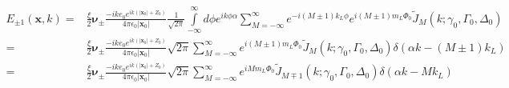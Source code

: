 \begin{align}
    E_{\pm1}({\bm x},k) = & \frac{\xi}2{\boldsymbol{\nu}_{\pm}}   \frac{-i k e_0 e^{ik (|{\bm x}_0|+Z_0)}}{4\pi\epsilon_0|{\bm x}_0|}\frac1{\sqrt{2\pi}}\int\limits_{-\infty}^{\infty}d\phi  e^{ik\phi\alpha}\sum\limits_{M=-\infty}^{\infty}e^{-i(M\pm1)k_L\phi}e^{i(M\pm1)m_L\varPhi_0}\tilde J_M(k;\gamma_0,\Gamma_0,\Delta_0)\nonumber          \\
    =                     & \frac{\xi}2{\boldsymbol{\nu}_{\pm}}   \frac{-i k e_0 e^{ik (|{\bm x}_0|+Z_0)}}{4\pi\epsilon_0|{\bm x}_0|}{\sqrt{2\pi}}\sum\limits_{M=-\infty}^{\infty} e^{i(M\pm1)m_L\varPhi_0}\tilde J_M(k;\gamma_0,\Gamma_0,\Delta_0)\delta(                                                            \alpha k-(M\pm1)k_L)\nonumber \\
    =                     & \frac{\xi}2{\boldsymbol{\nu}_{\pm}}   \frac{-i k e_0 e^{ik (|{\bm x}_0|+Z_0)}}{4\pi\epsilon_0|{\bm x}_0|}{\sqrt{2\pi}}\sum\limits_{M=-\infty}^{\infty} e^{iMm_L\varPhi_0}\tilde J_{M\mp1}(k;\gamma_0,\Gamma_0,\Delta_0)\delta(                                                            \alpha k-Mk_L)
\end{align}

